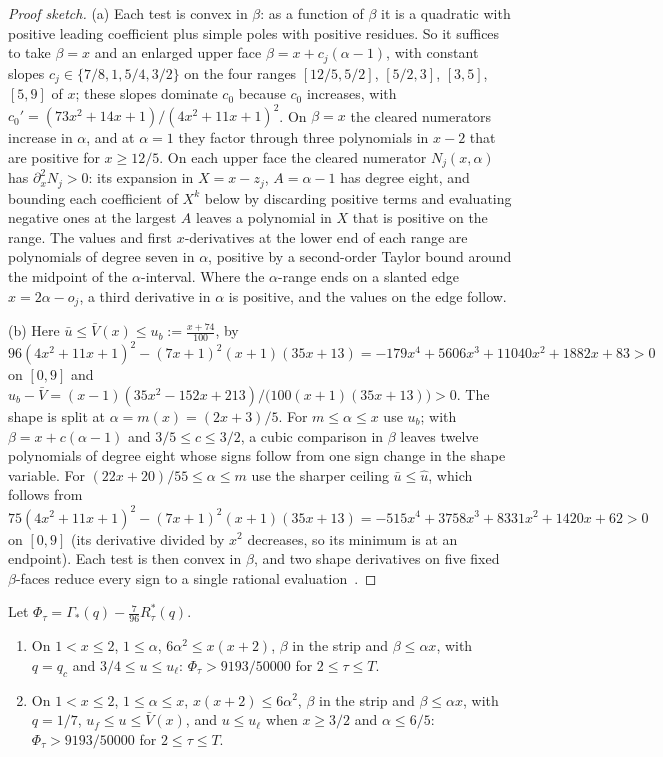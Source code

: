\begin{proof}[Proof sketch]
(a) Each test is convex in $\beta$: as a function of $\beta$ it is a quadratic with positive
leading coefficient plus simple poles with positive residues. So it suffices to take $\beta=x$
and an enlarged upper face $\beta=x+c_j(\alpha-1)$, with constant slopes $c_j\in\{7/8,1,5/4,3/2\}$
on the four ranges $[12/5,5/2]$, $[5/2,3]$, $[3,5]$, $[5,9]$ of $x$; these slopes dominate $c_0$
because $c_0$ increases, with $c_0'=(73x^2+14x+1)/(4x^2+11x+1)^2$. On $\beta=x$ the cleared
numerators increase in $\alpha$, and at $\alpha=1$ they factor through three polynomials in
$x-2$ that are positive for $x\ge12/5$. On each upper face the cleared numerator $N_j(x,\alpha)$
has $\partial_x^2N_j>0$: its expansion in $X=x-z_j$, $A=\alpha-1$ has degree eight, and bounding
each coefficient of $X^k$ below by discarding positive terms and evaluating negative ones at the
largest $A$ leaves a polynomial in $X$ that is positive on the range. The values and first
$x$-derivatives at the lower end of each range are polynomials of degree seven in $\alpha$,
positive by a second-order Taylor bound around the midpoint of the $\alpha$-interval. Where the
$\alpha$-range ends on a slanted edge $x=2\alpha-o_j$, a third derivative in $\alpha$ is positive,
and the values on the edge follow.

(b) Here $\bar u\le\bar V(x)\le u_b:=\frac{x+74}{100}$, by
$96(4x^2+11x+1)^2-(7x+1)^2(x+1)(35x+13)=-179x^4+5606x^3+11040x^2+1882x+83>0$ on $[0,9]$ and
$u_b-\bar V=(x-1)(35x^2-152x+213)/\bigl(100(x+1)(35x+13)\bigr)>0$. The shape is split at
$\alpha=m(x)=(2x+3)/5$. For $m\le\alpha\le x$ use $u_b$; with $\beta=x+c(\alpha-1)$ and
$3/5\le c\le3/2$, a cubic comparison in $\beta$ leaves twelve polynomials of degree eight whose
signs follow from one sign change in the shape variable. For $(22x+20)/55\le\alpha\le m$ use the
sharper ceiling $\bar u\le\hat u$, which follows from
$75(4x^2+11x+1)^2-(7x+1)^2(x+1)(35x+13)=-515x^4+3758x^3+8331x^2+1420x+62>0$ on $[0,9]$ (its
derivative divided by $x^2$ decreases, so its minimum is at an endpoint). Each test is then convex
in $\beta$, and two shape derivatives on five fixed $\beta$-faces reduce every sign to a single
rational evaluation~\cite{LighterProofs}.
\end{proof}

\begin{proposition}\label{prop:ss-face-S1}
Let $\Phi_\tau=\Gamma_*(q)-\frac7{96}R^*_\tau(q)$.
\begin{enumerate}[label=(\alph*)]
\item On $1<x\le2$, $1\le\alpha$, $6\alpha^2\le x(x+2)$, $\beta$ in the strip and $\beta\le\alpha x$,
  with $q=q_c$ and $3/4\le u\le u_\ell$: $\Phi_\tau>9193/50000$ for $2\le\tau\le T$.
\item On $1<x\le2$, $1\le\alpha\le x$, $x(x+2)\le6\alpha^2$, $\beta$ in the strip and
  $\beta\le\alpha x$, with $q=1/7$, $u_f\le u\le\bar V(x)$, and $u\le u_\ell$ when $x\ge3/2$ and
  $\alpha\le6/5$: $\Phi_\tau>9193/50000$ for $2\le\tau\le T$.
\end{enumerate}
\end{proposition}

